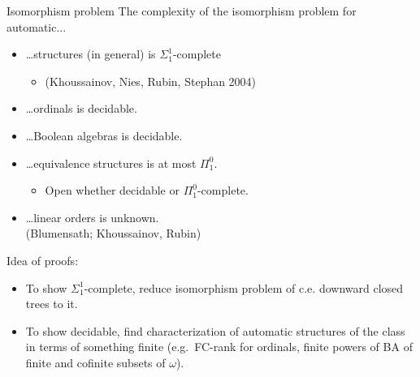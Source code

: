 \documentclass[style=fyma
 ]{powerdot}
\begin{document}
\begin{slide}{Isomorphism problem}
\vspace{-5pt}
  The complexity of the isomorphism problem for automatic...
  \begin{itemize}
    \item[] \ldots structures (in general) is $\Sigma^{1}_{1}$-complete
      \begin{itemize}
        \item[] \qquad (Khoussainov, Nies, Rubin, Stephan 2004)
      \end{itemize}
    \item[] \ldots ordinals is decidable.
    \item[] \ldots Boolean algebras is decidable.
    \item[] \ldots  equivalence structures is at most $\Pi^{0}_{1}$.  
      \begin{itemize}
        \item[] \qquad Open whether decidable or $\Pi^{0}_{1}$-complete.
      \end{itemize}
    \item[] \ldots linear orders is unknown.\\
    (Blumensath; Khoussainov, Rubin)
  \end{itemize}

\pause
Idea of proofs:
\begin{itemize}
\vspace{-5pt}
\item To show $\Sigma^{1}_{1}$-complete, reduce isomorphism problem of c.e. downward closed trees to it.
\item To show decidable, find characterization of automatic structures of the class in terms of something finite (e.g.\ FC-rank for ordinals, finite powers of BA of finite and cofinite subsets of $\omega$).
\end{itemize}
\end{slide}

\end{document}
